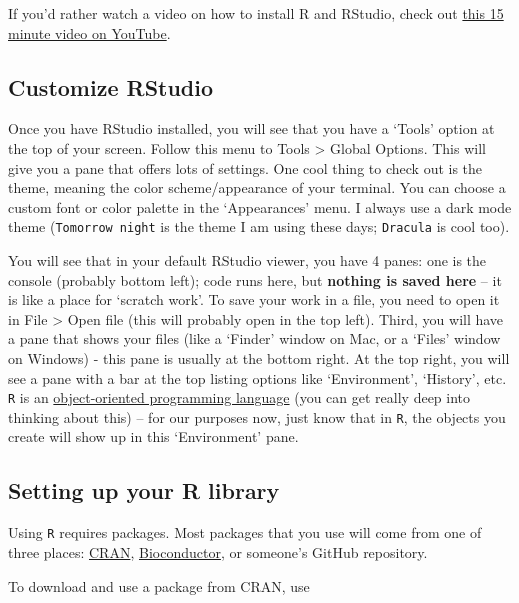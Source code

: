 \documentclass[
]{book}
\begin{document}
If you'd rather watch a video on how to install R and RStudio, check out \href{https://www.youtube.com/watch?v=lVKMsaWju8w}{this 15 minute video on YouTube}.

\hypertarget{customize-rstudio}{%
\subsection{Customize RStudio}\label{customize-rstudio}}

Once you have RStudio installed, you will see that you have a `Tools' option at the top of your screen. Follow this menu to Tools \textgreater{} Global Options. This will give you a pane that offers lots of settings. One cool thing to check out is the theme, meaning the color scheme/appearance of your terminal. You can choose a custom font or color palette in the `Appearances' menu. I always use a dark mode theme (\texttt{Tomorrow\ night} is the theme I am using these days; \texttt{Dracula} is cool too).

You will see that in your default RStudio viewer, you have 4 panes: one is the console (probably bottom left); code runs here, but \textbf{nothing is saved here} -- it is like a place for `scratch work'. To save your work in a file, you need to open it in File \textgreater{} Open file (this will probably open in the top left). Third, you will have a pane that shows your files (like a `Finder' window on Mac, or a `Files' window on Windows) - this pane is usually at the bottom right. At the top right, you will see a pane with a bar at the top listing options like `Environment', `History', etc. \texttt{R} is an \href{https://en.wikipedia.org/wiki/Object-oriented_programming}{object-oriented programming language} (you can get really deep into thinking about this) -- for our purposes now, just know that in \texttt{R}, the objects you create will show up in this `Environment' pane.

\hypertarget{setting-up-your-r-library}{%
\subsection{Setting up your R library}\label{setting-up-your-r-library}}

Using \texttt{R} requires packages. Most packages that you use will come from one of three places: \href{https://cran.r-project.org/}{CRAN}, \href{https://www.bioconductor.org/}{Bioconductor}, or someone's GitHub repository.

To download and use a package from CRAN, use
\end{document}
